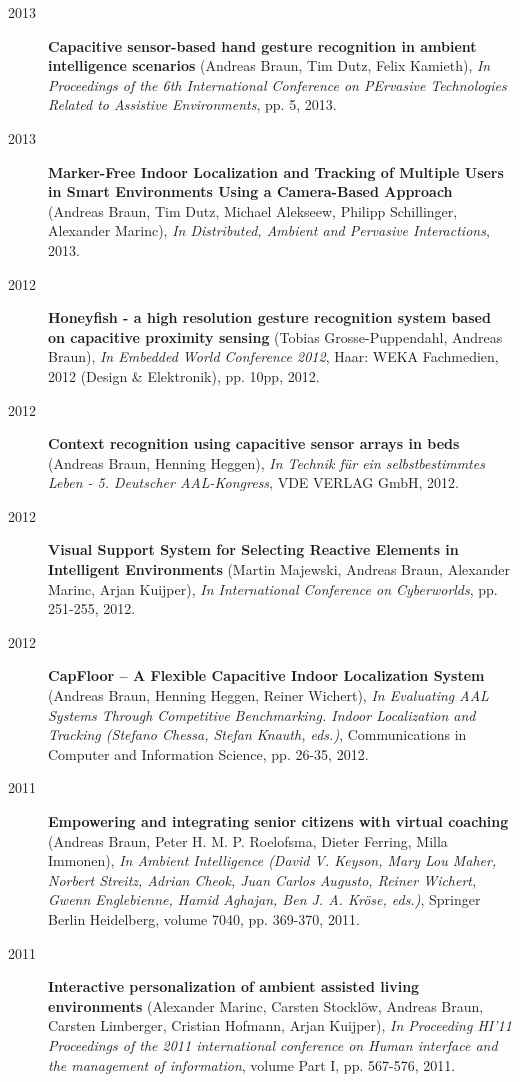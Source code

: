 \begin{appendix}
\begin{description}
\item[2013]{\bf Capacitive sensor-based hand gesture recognition in ambient intelligence scenarios} (Andreas Braun, Tim Dutz, Felix Kamieth), {\em In Proceedings of the 6th International Conference on PErvasive Technologies Related to Assistive Environments}, pp. 5, 2013.
\item[2013]{\bf Marker-Free Indoor Localization and Tracking of Multiple Users in Smart Environments Using a Camera-Based Approach} (Andreas Braun, Tim Dutz, Michael Alekseew, Philipp Schillinger, Alexander Marinc), {\em In Distributed, Ambient and Pervasive Interactions}, 2013.
\item[2012]{\bf Honeyfish - a high resolution gesture recognition system based on capacitive proximity sensing} (Tobias Grosse-Puppendahl, Andreas Braun), {\em In Embedded World Conference 2012}, Haar: WEKA Fachmedien, 2012 (Design \& Elektronik), pp. 10pp, 2012.
\item[2012]{\bf Context recognition using capacitive sensor arrays in beds} (Andreas Braun, Henning Heggen), {\em In Technik für ein selbstbestimmtes Leben - 5. Deutscher AAL-Kongress}, VDE VERLAG GmbH, 2012.
\item[2012]{\bf Visual Support System for Selecting Reactive Elements in Intelligent Environments} (Martin Majewski, Andreas Braun, Alexander Marinc, Arjan Kuijper), {\em In International Conference on Cyberworlds}, pp. 251-255, 2012.
\item[2012] {\bf CapFloor – A Flexible Capacitive Indoor Localization System} (Andreas Braun, Henning Heggen, Reiner Wichert), {\em In Evaluating AAL Systems Through Competitive Benchmarking. Indoor Localization and Tracking (Stefano Chessa, Stefan Knauth, eds.)}, Communications in Computer and Information Science, pp. 26-35, 2012.
\item[2011] {\bf Empowering and integrating senior citizens with virtual coaching} (Andreas Braun, Peter H. M. P. Roelofsma, Dieter Ferring, Milla Immonen), {\em In Ambient Intelligence (David V. Keyson, Mary Lou Maher, Norbert Streitz, Adrian Cheok, Juan Carlos Augusto, Reiner Wichert, Gwenn Englebienne, Hamid Aghajan, Ben J. A. Kröse, eds.)}, Springer Berlin Heidelberg, volume 7040, pp. 369-370, 2011.
\item[2011] {\bf Interactive personalization of ambient assisted living environments} (Alexander Marinc, Carsten Stocklöw, Andreas Braun, Carsten Limberger, Cristian Hofmann, Arjan Kuijper), {\em In Proceeding HI'11 Proceedings of the 2011 international conference on Human interface and the management of information}, volume Part I, pp. 567-576, 2011.

\end{description}
\end{appendix}
